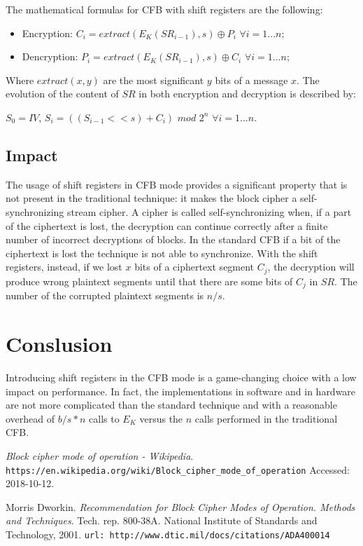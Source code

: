 \documentclass[11pt]{article}
\begin{document}
The mathematical formulas for CFB with shift registers are the following:

\begin{itemize}
\item Encryption: $C_i = extract(E_K(SR_{i-1}), s) \oplus P_i$ $\forall i = 1...n$;
\item Dencryption: $P_i = extract(E_K(SR_{i-1}), s) \oplus C_i$ $\forall i = 1...n$;
\end{itemize}

Where $extract(x, y)$ are the most significant $y$ bits of a message $x$. The evolution of the content of $SR$ in both encryption and decryption is described by:

$S_0 = IV$, $S_i = ((S_{i-1} << s) + C_i)$ $mod$ $2^n$ $\forall i = 1...n$.

\subsection{Impact}

The usage of shift registers in CFB mode provides a significant property that is not present in the traditional technique: it makes the block cipher a self-synchronizing stream cipher. A cipher is called self-synchronizing when, if a part of the ciphertext is lost, the decryption can continue correctly after a finite number of incorrect decryptions of blocks.
In the standard CFB if a bit of the ciphertext is lost the technique is not able to synchronize.
With the shift registers, instead, if we lost $x$ bits of a ciphertext segment $C_j$, the decryption will produce wrong plaintext segments until that there are some bits of $C_j$ in $SR$. The number of the corrupted plaintext segments is $n/s$.

\section{Conslusion}

Introducing shift registers in the CFB mode is a game-changing choice with a low impact on performance. In fact, the implementations in software and in hardware are not more complicated than the standard technique and with a reasonable overhead of $b/s * n$ calls to $E_K$ versus the $n$ calls performed in the traditional CFB. 

\vfill

\begin{thebibliography}{99}

{\em Block cipher mode of operation - Wikipedia}.
  \verb|https://en.wikipedia.org/wiki/Block_cipher_mode_of_operation|
  \newblock Accessed: 2018-10-12.

Morris Dworkin.
  {\em Recommendation for Block Cipher Modes of Operation. Methods and Techniques}.
  Tech. rep. 800-38A. National Institute of Standards and Technology, 2001.
  \newblock \verb|url: http://www.dtic.mil/docs/citations/ADA400014|

\end{thebibliography}
\end{document}
